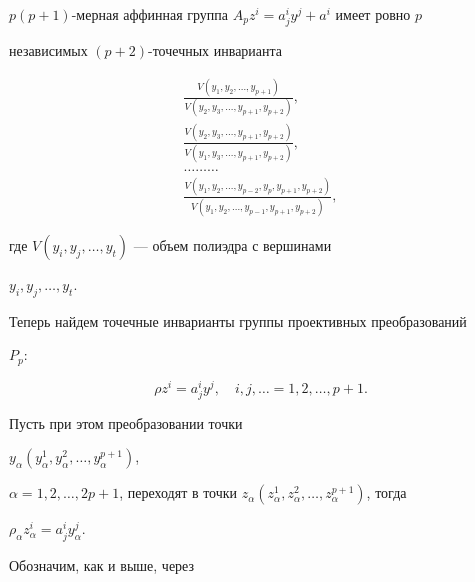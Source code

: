\begin{thm}


$p(p+1)$-мерная аффинная группа $A_p z^i=a^i_j y^j+a^i$ имеет ровно $p$


независимых $(p+2)$-точечных инварианта


\begin{gather*}


\frac{V(y_{1}, y_{2}, \dotsc, y_{p+1})}{V(y_{2}, y_{3},


\dotsc, y_{p+1}, y_{p+2})}, \\


%


\frac{V(y_{2}, y_{3}, \dotsc, y_{p+1}, y_{p+2})}{V(y_{1}, y_{3},


\dotsc, y_{p+1}, y_{p+2})}, \\


%


\dotsc\dotsc\dotsc \\


%


\frac{V(y_{1}, y_{2}, \dotsc, y_{p-2}, y_{p}, y_{p+1}, y_{p+2})}


{V(y_{1}, y_{2}, \dotsc, y_{p-1}, y_{p+1}, y_{p+2})},


\end{gather*}


где $V(y_i, y_j, \dotsc, y_t)$ --- объем полиэдра с вершинами


$y_i, y_j, \dotsc, y_t$.


\end{thm}





Теперь найдем точечные инварианты группы проективных преобразований


$P_p$:


$$


\rho z^{i}=a^{i}_{j}y^{j}, \quad i, j, \dotsc=1, 2, \dotsc,p+1.


$$


Пусть при этом преобразовании точки


$y_{\alpha}(y_{\alpha}^{1}, y_{\alpha}^{2}, \dotsc, y_{\alpha}^{p+1})$,


$\alpha=1, 2, \dotsc, 2p+1$, переходят в точки $z_{\alpha}(z_{\alpha}^{1},


z_{\alpha}^{2}, \dotsc, z_{\alpha}^{p+1})$, тогда


$\rho_{\alpha} z^{i}_{\alpha}=a^{i}_{j}y^{j}_{\alpha}$.


Обозначим, как и выше, через


